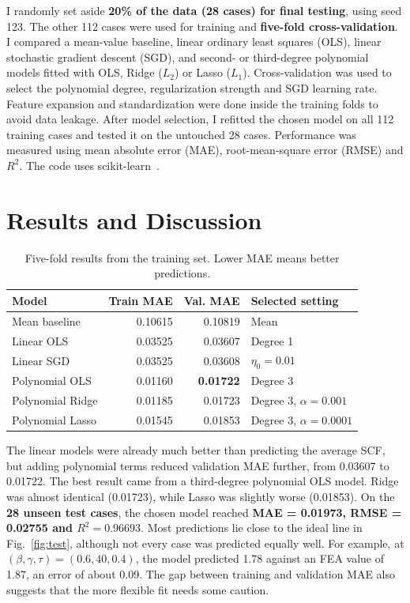 \documentclass[10pt,a4paper]{article}
\begin{document}
I randomly set aside \textbf{20\% of the data (28 cases) for final testing}, using seed 123. The other 112 cases were used for training and \textbf{five-fold cross-validation}. I compared a mean-value baseline, linear ordinary least squares (OLS), linear stochastic gradient descent (SGD), and second- or third-degree polynomial models fitted with OLS, Ridge ($L_2$) or Lasso ($L_1$). Cross-validation was used to select the polynomial degree, regularization strength and SGD learning rate. Feature expansion and standardization were done inside the training folds to avoid data leakage. After model selection, I refitted the chosen model on all 112 training cases and tested it on the untouched 28 cases. Performance was measured using mean absolute error (MAE), root-mean-square error (RMSE) and $R^2$. The code uses scikit-learn~\cite{sklearn}.

\section{Results and Discussion}
\begin{table}[ht]
\centering
\caption{Five-fold results from the training set. Lower MAE means better predictions.}
\small
\begin{tabular}{lrrl}
\toprule
Model & Train MAE & Val. MAE & Selected setting\\
\midrule
Mean baseline & 0.10615 & 0.10819 & Mean\\
Linear OLS & 0.03525 & 0.03607 & Degree 1\\
Linear SGD & 0.03525 & 0.03608 & $\eta_0=0.01$\\
Polynomial OLS & 0.01160 & \textbf{0.01722} & Degree 3\\
Polynomial Ridge & 0.01185 & 0.01723 & Degree 3, $\alpha=0.001$\\
Polynomial Lasso & 0.01545 & 0.01853 & Degree 3, $\alpha=0.0001$\\
\bottomrule
\end{tabular}
\end{table}

The linear models were already much better than predicting the average SCF, but adding polynomial terms reduced validation MAE further, from 0.03607 to 0.01722. The best result came from a third-degree polynomial OLS model. Ridge was almost identical (0.01723), while Lasso was slightly worse (0.01853). On the \textbf{28 unseen test cases}, the chosen model reached \textbf{MAE = 0.01973, RMSE = 0.02755 and $R^2=0.96693$}. Most predictions lie close to the ideal line in Fig.~\ref{fig:test}, although not every case was predicted equally well. For example, at $(\beta,\gamma,\tau)=(0.6,40,0.4)$, the model predicted 1.78 against an FEA value of 1.87, an error of about 0.09. The gap between training and validation MAE also suggests that the more flexible fit needs some caution.
\end{document}
